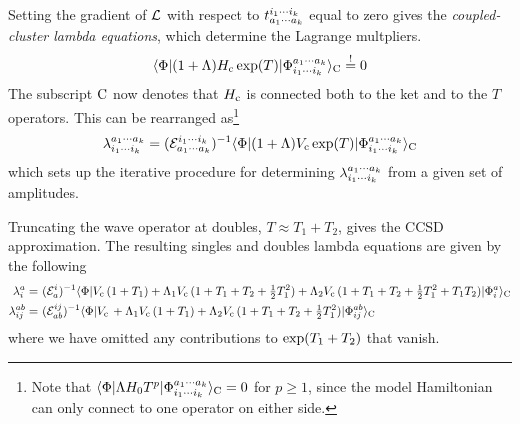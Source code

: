 \documentclass[11pt]{article}
\numberwithin{equation}{section}
\begin{document}
\begin{dfn}
Setting the gradient of $\mathcal{L}$ with respect to $t_{a_1\cdots a_k}^{i_1\cdots i_k}$ equal to zero gives the \textit{coupled-cluster lambda equations}, which determine the Lagrange multpliers.
\begin{align}
  \langle\Phi |
  (
    1
  +
    \Lambda 
  )
  H_{\mathrm{c}}\,
  \mathrm{exp}(T)
  |\Phi _{i_1\cdots i_k}^{a_1\cdots a_k}\rangle_{\mathrm{C}}
\overset{!}{=}
  0
\end{align}
The subscript $\mathrm{C}$ now denotes that $H_{\mathrm{c}}$ is connected both to the ket and to the $T$ operators.
This can be rearranged as\footnote{Note that $\langle\Phi |\Lambda  H_0 T^p|\Phi _{i_1\cdots i_k}^{a_1\cdots a_k}\rangle_{\mathrm{C}}=0$ for $p\geq 1$, since the model Hamiltonian can only connect to one operator on either side.}
\begin{align}
  \lambda _{i_1\cdots i_k}^{a_1\cdots a_k}
=
  (\mathcal{E}_{a_1\cdots a_k}^{i_1\cdots i_k})^{-1}
  \langle\Phi |
  (
    1
  +
    \Lambda 
  )
  V_{\mathrm{c}}\,
  \mathrm{exp}(T)
  |\Phi _{i_1\cdots i_k}^{a_1\cdots a_k}\rangle_{\mathrm{C}}
\end{align}
which sets up the iterative procedure for determining $\lambda _{i_1\cdots i_k}^{a_1\cdots a_k}$ from a given set of amplitudes.
\end{dfn}


\begin{ex}
Truncating the wave operator at doubles, $T\approx T_1 + T_2$, gives the CCSD approximation.
The resulting singles and doubles lambda equations are given by the following
\begin{align*}
  \lambda _i^a
=&\
  (\mathcal{E}_a^i)^{-1}
  \langle\Phi |
    V_{\mathrm{c}}\,
    (
      1
    +
      T_1
    )
  +
    \Lambda _1
    V_{\mathrm{c}}\,
    (
      1
    +
      T_1
    +
      T_2
    +
      \tfrac{1}{2}
      T_1^2
    )
  +
    \Lambda _2
    V_{\mathrm{c}}\,
    (
      1
    +
      T_1
    +
      T_2
    +
      \tfrac{1}{2}
      T_1^2
    +
      T_1
      T_2
    )
  |\Phi _i^a\rangle_{\mathrm{C}}
\\
  \lambda _{ij}^{ab}
=&\
  (\mathcal{E}_{ab}^{ij})^{-1}
  \langle\Phi |
    V_{\mathrm{c}}\,
  +
    \Lambda _1
    V_{\mathrm{c}}\,
    (
      1
    +
      T_1
    )
  +
    \Lambda _2
    V_{\mathrm{c}}\,
    (
      1
    +
      T_1
    +
      T_2
    +
      \tfrac{1}{2}
      T_1^2
    )
  |\Phi _{ij}^{ab}\rangle_{\mathrm{C}}
\end{align*}
where we have omitted any contributions to $\mathrm{exp}(T_1 + T_2)$ that vanish.
\end{ex}
\end{document}
